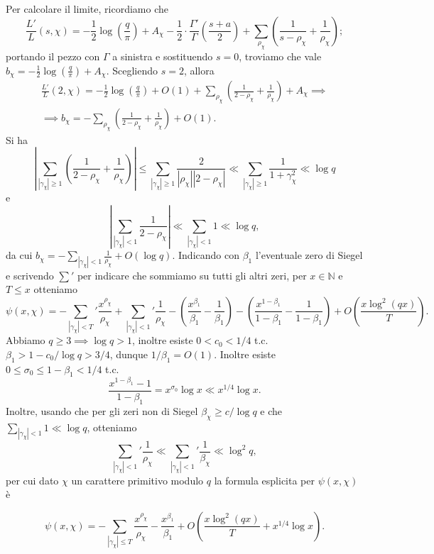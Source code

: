 Per calcolare il limite, ricordiamo che
$$\frac{L'}{L}(s,\chi)=-\frac{1}{2}\log\left(\frac{q}{\pi}\right)+A_\chi-\frac{1}{2}\cdot\frac{\Gamma'}{\Gamma}\left(\frac{s+a}{2}\right)+\sum_{\rho_\chi} \left(\frac{1}{s-\rho_\chi}+\frac{1}{\rho_\chi}\right);$$
portando il pezzo con $\Gamma$ a sinistra e sostituendo $s=0$, troviamo che vale
$b_\chi=-\frac{1}{2}\log\left(\frac{q}{\pi}\right)+A_\chi$. Scegliendo $s=2$, allora
\begin{gather*}
  \frac{L'}{L}(2,\chi)=-\frac{1}{2}\log\left(\frac{q}{\pi}\right)+O(1)+\sum_{\rho_\chi}\left(\frac{1}{2-\rho_\chi}+\frac{1}{\rho_\chi}\right)+A_\chi \implies \\
  \implies b_\chi=-\sum_{\rho_\chi}\left(\frac{1}{2-\rho_\chi}+\frac{1}{\rho_\chi}\right)+O(1).
\end{gather*}
Si ha
$$\left|\sum_{|\gamma_\chi| \ge 1} \left(\frac{1}{2-\rho_\chi}+\frac{1}{\rho_\chi}\right)\right| \le \sum_{|\gamma_\chi| \ge 1} \frac{2}{|\rho_\chi||2-\rho_\chi|} \ll \sum_{|\gamma_\chi| \ge 1} \frac{1}{1+\gamma_\chi^2} \ll \log{q}$$
e
$$\left|\sum_{|\gamma_\chi|<1} \frac{1}{2-\rho_\chi} \right| \ll \sum_{|\gamma_\chi|<1} 1 \ll \log{q},$$
da cui $\displaystyle b_\chi=-\sum_{|\gamma_\chi|<1} \frac{1}{\rho_\chi}+O(\log{q})$.
Indicando con $\beta_1$ l'eventuale zero di Siegel e scrivendo $\displaystyle \sum'$ per indicare che sommiamo su tutti gli altri zeri, per $x \in \mathbb{N}$ e $T \le x$ otteniamo
$$\psi(x,\chi)=-\sum_{|\gamma_\chi|<T}' \frac{x^{\rho_\chi}}{\rho_\chi}+\sum_{|\gamma_\chi|<1}' \frac{1}{\rho_\chi}-\left(\frac{x^{\beta_1}}{\beta_1}-\frac{1}{\beta_1}\right)-\left(\frac{x^{1-\beta_1}}{1-\beta_1}-\frac{1}{1-\beta_1}\right)+O\left(\frac{x\log^2(qx)}{T}\right).$$
Abbiamo $q \ge 3 \implies \log{q}>1$, inoltre esiste $0<c_0<1/4$ t.c. $\beta_1>1-c_0/\log{q}>3/4$, dunque $1/\beta_1=O(1)$. Inoltre esiste $0 \le \sigma_0 \le 1-\beta_1<1/4$ t.c.
$$\frac{x^{1-\beta_1}-1}{1-\beta_1}=x^{\sigma_0}\log{x} \ll x^{1/4}\log{x}.$$
Inoltre, usando che per gli zeri non di Siegel $\beta_\chi \ge c/\log{q}$ e che $\displaystyle \sum_{|\gamma_\chi|<1} 1 \ll \log{q}$, otteniamo
$$\sum_{|\gamma_\chi|<1}' \frac{1}{\rho_\chi} \ll \sum_{|\gamma_\chi|<1}' \frac{1}{\beta_\chi} \ll \log^2{q},$$
per cui dato $\chi$ un carattere primitivo modulo $q$ la formula esplicita per $\psi(x,\chi)$ è

\begin{equation} \label{expl}
  \psi(x,\chi)=-\sum_{|\gamma_\chi| \le T} \frac{x^{\rho_\chi}}{\rho_\chi}-\frac{x^{\beta_1}}{\beta_1}+O\left(\frac{x\log^2(qx)}{T}+x^{1/4}\log{x}\right).
\end{equation}

